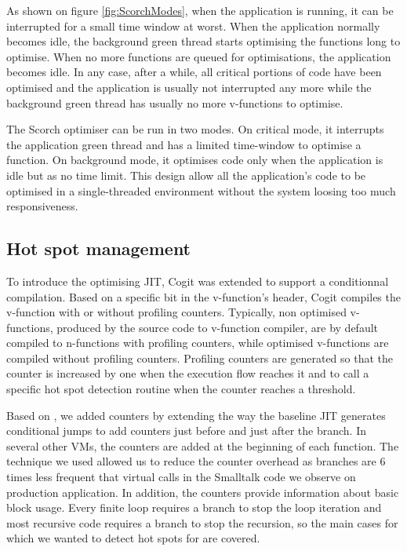 \documentclass[a4paper,12pt,twoside]{../includes/ThesisStyle}
\begin{document}
As shown on figure \ref{fig:ScorchModes}, when the application is running, it can be interrupted for a small time window at worst. When the application normally becomes idle, the background green thread starts optimising the functions long to optimise. When no more functions are queued for optimisations, the application becomes idle. In any case, after a while, all critical portions of code have been optimised and the application is usually not interrupted any more while the background green thread has usually no more v-functions to optimise.

The Scorch optimiser can be run in two modes. On critical mode, it interrupts the application green thread and has a limited time-window to optimise a function. On background mode, it optimises code only when the application is idle but as no time limit. This design allow all the application's code to be optimised in a single-threaded environment without the system loosing too much responsiveness.

\subsection{Hot spot management}

To introduce the optimising JIT, Cogit was extended to support a conditionnal compilation. Based on a specific bit in the v-function's header, Cogit compiles the v-function with or without profiling counters. Typically, non optimised v-functions, produced by the source code to v-function compiler, are by default compiled to n-functions with profiling counters, while optimised v-functions are compiled without profiling counters. Profiling counters are generated so that the counter is increased by one when the execution flow reaches it and to call a specific hot spot detection routine when the counter reaches a threshold.


Based on \cite{Arn02}, we added counters by extending the way the baseline JIT generates conditional jumps to add counters just before and just after the branch. In several other VMs, the counters are added at the beginning of each function. The technique we used allowed us to reduce the counter overhead as branches are 6 times less frequent that virtual calls in the Smalltalk code we observe on production application. In addition, the counters provide information about basic block usage. Every finite loop requires a branch to stop the loop iteration and most recursive code requires a branch to stop the recursion, so the main cases for which we wanted to detect hot spots for are covered.
\end{document}
